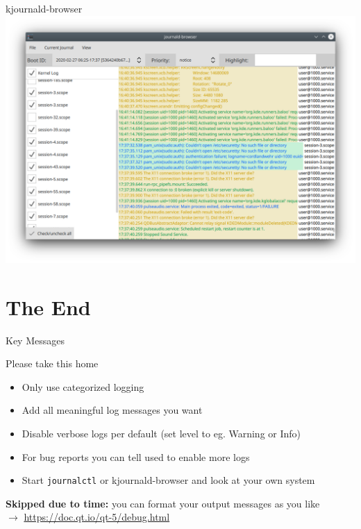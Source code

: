\documentclass[t,compress,aspectratio=169]{beamer}
\begin{document}
\begin{frame}
    {kjournald-browser}
    \centering
    \vspace{-2.5em}
    \includegraphics[width=.8\textwidth]{kjournaldbrowser}
\end{frame}

\section{The End}
\begin{frame}{Key Messages}
    \begin{block}{Please take this home}
        \begin{itemize}
            \item Only use categorized logging
            \item Add all meaningful log messages you want
            \item Disable verbose logs per default (set level to eg. Warning or Info)
            \item For bug reports you can tell used to enable more logs
            \item Start \texttt{journalctl} or kjournald-browser and look at your own system
        \end{itemize}
    \end{block}
    \bigskip

    \textbf{Skipped due to time:} you can format your output messages as you like\\
    $\rightarrow$ \url{https://doc.qt.io/qt-5/debug.html}
\end{frame}
\end{document}
